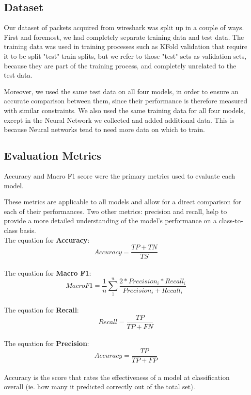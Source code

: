 \documentclass[10pt,sigconf,letterpaper,nonacm]{acmart}
\begin{document}
\subsection{Dataset}
Our dataset of packets acquired from wireshark was split up in a couple of ways. First and foremost, we had completely separate training data and test data. The training data was used in training processes such as KFold validation that require it to be split "test"-train splits, but we refer to those "test" sets as validation sets, because they are part of the training process, and completely unrelated to the test data.

Moreover, we used the same test data on all four models, in order to ensure an accurate comparison between them, since their performance is therefore measured with similar constraints.
We also used the same training data for all four models, except in the Neural Network we collected and added additional data. This is because Neural networks tend to need more data on which to train.

\subsection{Evaluation Metrics}
Accuracy and Macro F1 score were the primary metrics used to evaluate each model. 

These metrics are applicable to all models and allow for
a direct comparison for each of their performances. Two other metrics: precision and recall, help to provide a more detailed understanding of the model's performance on a class-to-class basis.
\newline \\
The equation for \textbf{Accuracy}: \\
\[
Accuracy= \frac{TP + TN}{TS}
\]
\newline \\
The equation for \textbf{Macro F1}: \\
\[
Macro F 1= \frac{1}{n} \sum_{1}^{n} \frac{2*Precision_i*Recall_i}{Precision_i+Recall_i}
\]
\newline \\
The equation for \textbf{Recall}: \\
\[
Recall= \frac{TP}{TP + FN}
\]
\newline \\
The equation for \textbf{Precision}: \\
\[
Accuracy= \frac{TP}{TP + FP}
\]
\\
Accuracy is the score that rates the effectiveness of a model at classification overall (ie. how many it predicted correctly out of the total set). 
\end{document}
